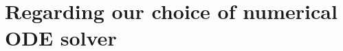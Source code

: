 \section{Regarding our choice of numerical ODE solver}
\label{sec:regarding_our_choice_of_numerical_ode_solver}
